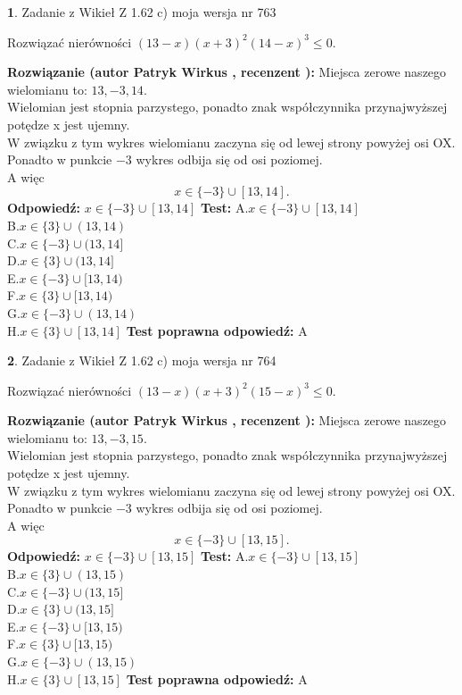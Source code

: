 \documentclass[12pt, a4paper]{article}
\theoremstyle{definition} %
\newtheorem{zad}{}
\newcommand{\zadStart}[1]{\begin{zad}#1\newline}
\newcommand{\zadStop}{\end{zad}}
\newcommand{\rozwStart}[2]{\noindent \textbf{Rozwiązanie (autor #1 , recenzent #2): }\newline}
\newcommand{\rozwStop}{\newline}
\newcommand{\odpStart}{\noindent \textbf{Odpowiedź:}\newline}
\newcommand{\odpStop}{\newline}
\newcommand{\testStart}{\noindent \textbf{Test:}\newline}
\newcommand{\testStop}{\newline}
\newcommand{\kluczStart}{\noindent \textbf{Test poprawna odpowiedź:}\newline}
\newcommand{\kluczStop}{\newline}
\begin{document}
\zadStart{Zadanie z Wikieł Z 1.62 c) moja wersja nr 763}

Rozwiązać nierówności $(13-x)(x+3)^{2}(14-x)^{3}\le0$.
\zadStop
\rozwStart{Patryk Wirkus}{}
Miejsca zerowe naszego wielomianu to: $13, -3, 14$.\\
Wielomian jest stopnia parzystego, ponadto znak współczynnika przy\linebreak najwyższej potędze x jest ujemny.\\ W związku z tym wykres wielomianu zaczyna się od lewej strony powyżej osi OX.\\
Ponadto w punkcie $-3$ wykres odbija się od osi poziomej.\\
A więc $$x \in \{-3\} \cup [13,14].$$
\rozwStop
\odpStart
$x \in \{-3\} \cup [13,14]$
\odpStop
\testStart
A.$x \in \{-3\} \cup [13,14]$\\
B.$x \in \{3\} \cup (13,14)$\\
C.$x \in \{-3\} \cup (13,14]$\\
D.$x \in \{3\} \cup (13,14]$\\
E.$x \in \{-3\} \cup [13,14)$\\
F.$x \in \{3\} \cup [13,14)$\\
G.$x \in \{-3\} \cup (13,14)$\\
H.$x \in \{3\} \cup [13,14]$
\testStop
\kluczStart
A
\kluczStop



\zadStart{Zadanie z Wikieł Z 1.62 c) moja wersja nr 764}

Rozwiązać nierówności $(13-x)(x+3)^{2}(15-x)^{3}\le0$.
\zadStop
\rozwStart{Patryk Wirkus}{}
Miejsca zerowe naszego wielomianu to: $13, -3, 15$.\\
Wielomian jest stopnia parzystego, ponadto znak współczynnika przy\linebreak najwyższej potędze x jest ujemny.\\ W związku z tym wykres wielomianu zaczyna się od lewej strony powyżej osi OX.\\
Ponadto w punkcie $-3$ wykres odbija się od osi poziomej.\\
A więc $$x \in \{-3\} \cup [13,15].$$
\rozwStop
\odpStart
$x \in \{-3\} \cup [13,15]$
\odpStop
\testStart
A.$x \in \{-3\} \cup [13,15]$\\
B.$x \in \{3\} \cup (13,15)$\\
C.$x \in \{-3\} \cup (13,15]$\\
D.$x \in \{3\} \cup (13,15]$\\
E.$x \in \{-3\} \cup [13,15)$\\
F.$x \in \{3\} \cup [13,15)$\\
G.$x \in \{-3\} \cup (13,15)$\\
H.$x \in \{3\} \cup [13,15]$
\testStop
\kluczStart
A
\kluczStop
\end{document}
